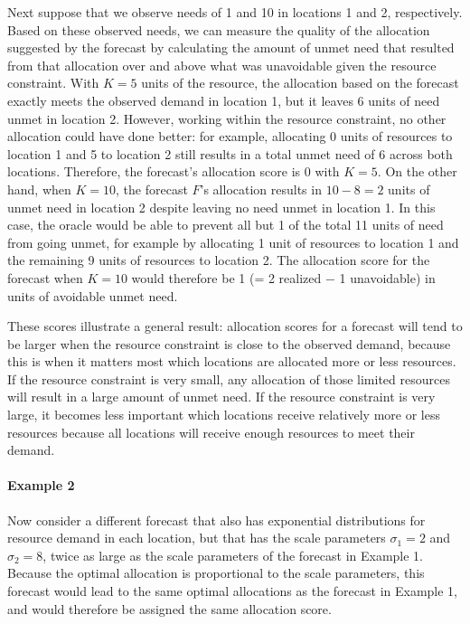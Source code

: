 \documentclass{article}
\begin{document}
Next suppose that we observe needs of 1 and 10 in locations 1 and 2, respectively.
Based on these observed needs, we can measure the quality of the allocation suggested by the forecast by calculating the amount of unmet need that resulted from that allocation over and above what was unavoidable given the resource constraint.
With $K = 5$ units of the resource, the allocation based on the forecast exactly meets the observed demand in location 1, but it leaves 6 units of need unmet in location 2.
However, working within the resource constraint, no other allocation could have done better: for example, allocating 0 units of resources to location 1 and 5 to location 2 still results in a total unmet need of 6 across both locations. Therefore, the forecast's allocation score is 0 with $K = 5$.
On the other hand, when $K = 10$, the forecast $F$'s allocation results in $10 - 8 = 2$ units of unmet need in location 2 despite leaving no need unmet in location 1.
In this case, the oracle would be able to prevent all but 1 of the total 11 units of need from going unmet, for example by allocating 1 unit of resources to location 1 and the remaining 9 units of resources to location 2.
The allocation score for the forecast when $K = 10$ would therefore be 1 (= 2 realized $-$ 1 unavoidable) in units of avoidable unmet need.

These scores illustrate a general result: allocation scores for a forecast will tend to be larger when the resource constraint is close to the observed demand, because this is when it matters most which locations are allocated more or less resources. If the resource constraint is very small, any allocation of those limited resources will result in a large amount of unmet need. If the resource constraint is very large, it becomes less important which locations receive relatively more or less resources because all locations will receive enough resources to meet their demand.

\paragraph{Example 2} Now consider a different forecast that also has exponential distributions for resource demand in each location, but that has the scale parameters $\sigma_1 = 2$ and $\sigma_2 = 8$, twice as large as the scale parameters of the forecast in Example 1. Because the optimal allocation is proportional to the scale parameters, this forecast would lead to the same optimal allocations as the forecast in Example 1, and would therefore be assigned the same allocation score.
\end{document}
